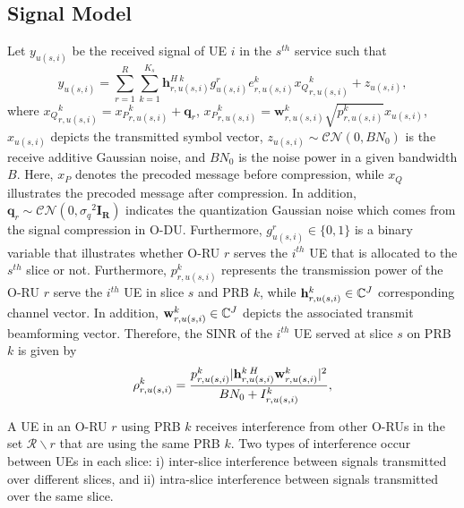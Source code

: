 \documentclass[lettersize,journal]{IEEEtran}
\begin{document}
\subsection{Signal Model}
\vspace{-1mm}
Let $y_{u(s,i)} $ be the received signal of UE $i$ in the $s^{th}$ service such that
\begin{equation}\label{eq2}
y_{u(s,i)}\!\!=\!\!\sum_{r\!=\!1}^{R}\!\sum_{k\!=\!1}^{K_s} \!\boldsymbol{h}^{H \: k}_{r,u(s,i)} g_{u(s,i)}^r\! e^k_{r,u(s,i)}{x_Q}^k_{r,u(s,i)}\!\!+\!z_{u(s,i)},
\end{equation}
where ${x_Q}^k_{r,u(s,i)}\!=\!{x_P}^k_{r,u(s,i)}\!\!+\! \boldsymbol{q}_{r}$, ${x_P}^k_{r,u(s,i)}\!=\! \boldsymbol{w}^k_{r,u(s,i)}\!\sqrt{p^{k}_{r,u(s,i)}} x_{u(s,i)}$,  $ x_{u(s,i)}$ depicts the transmitted symbol vector, $z_{u(s,i)}\sim \mathcal{CN}(0,BN_0)$ is the receive additive Gaussian noise, and $BN_0$ is the noise power in a given bandwidth $B$.
Here, ${x_P}$ denotes the precoded message before compression, while ${x_Q}$ illustrates the precoded message after compression.%
In addition, $\boldsymbol{q}_{r} \sim  \mathcal{CN}(0,{\sigma_q}^2\boldsymbol{I_{R}} )$ indicates the quantization Gaussian noise which comes from the signal compression in O-DU.
Furthermore, $g_{u(s,i)}^r \in \{0,1\}$ is a binary variable that illustrates whether O-RU $r$ serves the $i^{th}$ UE that is allocated to the $s^{th}$ slice or not.
Furthermore, $p_{r,u(s,i)}^{k}$ represents the transmission power of the O-RU $r$ serve the $i^{th}$ UE in slice $s$ and PRB $k$, while
${\bold{h}_{r,u(s,i)}^{k}} \in \mathbb{C}^{J}$ corresponding channel vector.
In addition, $\bold{w}_{r,u(s,i)}^{k} \in \mathbb{C}^{J}$ depicts the associated transmit beamforming vector.
Therefore, the SINR of the $i^{th}$ UE served at slice $s$ on PRB $k$ is given by
\begin{equation}\label{eq1}
\rho_{r,u(s,i)}^{k} =  \frac{p_{r,u(s,i)}^{k}|{\bold{h}_{r,u(s,i)}^{k \: H}} \bold{w}_{r,u(s,i)}^{k}|^2}{BN_0 + I_{r,u(s,i)}^{k}},
\end{equation}

A UE in an O-RU $r$ using PRB $k$ receives interference from other O-RUs in the set $\mathcal{R}\backslash r$ that are using the same PRB $k$. Two types of interference occur between UEs in each slice: i) inter-slice interference between signals transmitted over different slices, and ii) intra-slice interference between signals transmitted over the same slice.%
 
\end{document}
